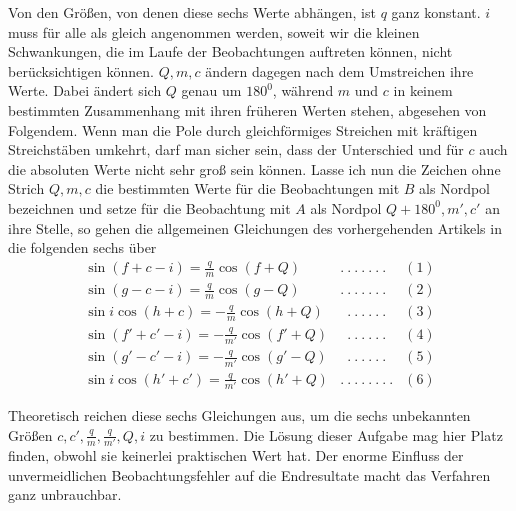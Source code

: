 Von den Größen, von denen diese sechs Werte abhängen, ist $q$ ganz konstant. $i$ muss für alle als gleich angenommen werden, soweit wir die kleinen Schwankungen, die im Laufe der Beobachtungen auftreten können, nicht berücksichtigen können. $Q,m,c$ ändern dagegen nach dem Umstreichen ihre Werte. Dabei ändert sich $Q$ genau um $180^0$, während $m$ und $c$ in keinem bestimmten Zusammenhang mit ihren früheren Werten stehen, abgesehen von Folgendem. Wenn man die Pole durch gleichförmiges Streichen mit kräftigen Streichstäben umkehrt, darf man sicher sein, dass der Unterschied und für $c$ auch die absoluten Werte nicht sehr groß sein können. Lasse ich nun die Zeichen ohne Strich $Q,m,c$ die bestimmten Werte für die Beobachtungen mit $B$ als Nordpol bezeichnen und setze für die Beobachtung mit $A$ als Nordpol $Q+180^0,m',c'$ an ihre Stelle, so gehen die allgemeinen Gleichungen des vorhergehenden Artikels in die folgenden sechs über
\[
\begin{array}{lll}
\sin(f+c-i)=\frac{q}{m}\cos(f+Q)&.\ .\ .\ .\ .\ .\ .&(1)\\[4pt]
\sin(g-c-i)=\frac{q}{m}\cos(g-Q)&.\ .\ .\ .\ .\ .\ .&(2)\\[4pt]
\sin i\cos(h+c)=-\frac{q}{m}\cos(h+Q)&\phantom{.}\ .\ .\ .\ .\ .\ .&(3)\\[4pt]
\sin(f'+c'-i)=-\frac{q}{m'}\cos(f'+Q)&\phantom{.}\ .\ .\ .\ .\ .\ .&(4)\\[4pt]
\sin(g'-c'-i)=-\frac{q}{m'}\cos(g'-Q)&\phantom{.}\ .\ .\ .\ .\ .\ .&(5)\\[4pt]
\sin i\cos(h'+c')=\frac{q}{m'}\cos(h'+Q)&.\ .\ .\ .\ .\ .\ .\ .&(6)
\end{array}
\]

Theoretisch reichen diese sechs Gleichungen aus, um die sechs unbekannten Größen $c,c',\frac{q}{m},\frac{q}{m'},Q,i$ zu bestimmen. Die Lösung dieser Aufgabe mag hier Platz finden, obwohl sie keinerlei praktischen Wert hat. Der enorme Einfluss der unvermeidlichen Beobachtungsfehler auf die Endresultate macht das Verfahren ganz unbrauchbar.

